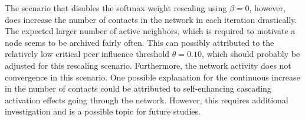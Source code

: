 The scenario that disables the softmax weight rescaling using \( \beta = 0 \), however, does increase the number of contacts in the network in each iteration drastically.
The expected larger number of active neighbors, which is required to motivate a node seems to be archived fairly often.
This can possibly attributed to the relatively low critical peer influence threshold \( \theta = 0.10 \), which should probably be adjusted for this rescaling scenario.
Furthermore, the network activity does not convergence in this scenario.
One possible explanation for the continuous increase in the number of contacts could be attributed to self-enhancing cascading activation effects going through the network.
However, this requires additional investigation and is a possible topic for future studies. 
